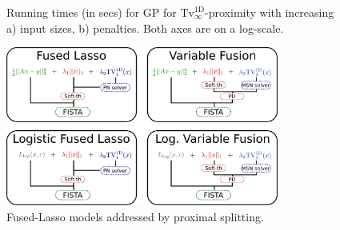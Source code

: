 \documentclass[twoside,11pt]{article}
\newcommand{\tvell}{\text{Tv}}
\newcommand{\oned}{\text{1D}}
\numberwithin{equation}{section}
\numberwithin{theorem}{section}
\begin{document}
\begin{figure}[htbp]
  \centering
  \caption{Running times (in secs) for GP for $\tvell_{\infty}^{\oned}$-proximity with increasing a) input sizes, b) penalties. Both axes are on a log-scale.
   \label{fig:tvinfrun}
   }
\end{figure}

\begin{figure}[htbp]
 \centering
 \includegraphics[width = 0.8\textwidth]{fusedLasso}
 \caption{
  \label{fig:FLmodels}
  Fused-Lasso models addressed by proximal splitting.
 }
\end{figure}
\end{document}
